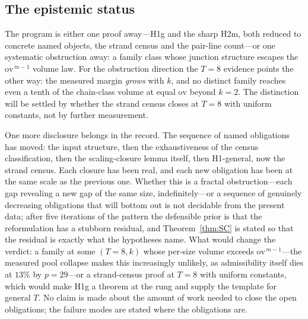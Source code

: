 \subsection{The epistemic status}\label{sec:scale-status}

The program is either one proof away---H1g and the sharp H2m, both
reduced to concrete named objects, the strand census and the pair-line
count---or one systematic obstruction away: a family class whose
junction structure escapes the $\mathrm{ov}^{\,m-1}$ volume law. For
the obstruction direction the $T=8$ evidence points the other way: the
measured margin \emph{grows} with $k$, and no distinct family reaches
even a tenth of the chain-class volume at equal $\mathrm{ov}$ beyond
$k=2$. The distinction will be settled by whether the strand census
closes at $T=8$ with uniform constants, not by further measurement.

One more disclosure belongs in the record. The sequence of named
obligations has moved: the input structure, then the exhaustiveness of
the census classification, then the scaling-closure lemma itself, then
H1-general, now the strand census. Each closure has been real, and
each new obligation has been at the same scale as the previous one.
Whether this is a fractal obstruction---each gap revealing a new gap of
the same size, indefinitely---or a sequence of genuinely decreasing
obligations that will bottom out is not decidable from the present
data; after five iterations of the pattern the defensible prior is that
the reformulation has a stubborn residual, and Theorem~\ref{thm:SC} is
stated so that the residual is exactly what the hypotheses name. What
would change the verdict: a family at some $(T=8,k)$ whose per-size
volume exceeds $\mathrm{ov}^{\,m-1}$---the measured pool collapse
makes this increasingly unlikely, as admissibility itself dies at
$13\%$ by $p=29$---or a strand-census proof at $T=8$ with uniform
constants, which would make H1g a theorem at the rung and supply the
template for general $T$. No claim is made about the amount of work
needed to close the open obligations; the
failure modes are stated where the obligations are.

